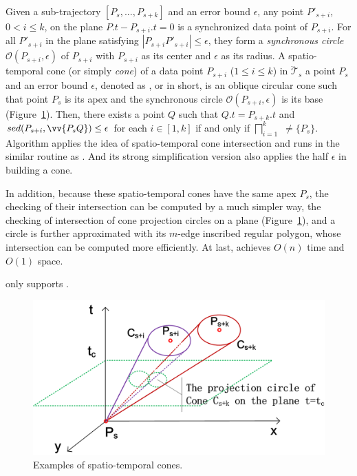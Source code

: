 Given a sub-trajectory $[P_s,...,P_{s+k}]$ and an error bound $\epsilon$, any point $P'_{s+i}$, $0< i \le k$, on the plane $P.t-P_{s+i}.t = 0$ is a synchronized data point of $P_{s+i}$. For all $P'_{s+i}$ in the plane satisfying $|P_{s+i}P'_{s+i}| \le \epsilon$, they form a \textit{synchronous circle $\mathcal{O}(P_{s+i}, \epsilon)$} of $P_{s+i}$ with $P_{s+i}$ as its center and $\epsilon$ as its radius.
%
A spatio-temporal cone (or simply \textit{cone}) of a data point $P_{s+i}$ ($1\le i\le k$) in $\dddot{\mathcal{T}}_s$ \wrt a point $P_s$ and an error bound $\epsilon$, denoted as , or  in short, is an oblique circular cone such that point $P_s$ is its apex and the synchronous circle $\mathcal{O}(P_{s+i}, \epsilon)$ is its base (Figure~\ref{fig:cis}).
%
Then, there exists a point $Q$ such that $Q.t = P_{s+k}.t$ and $sed(P_{s+i}, \vv{P_sQ})\le \epsilon$ for each $i \in [1,k]$ if and only if $\bigsqcap_{i=1}^{k}$ $\ne \{P_s\}$.
%
Algorithm \cised applies the idea of spatio-temporal cone intersection and runs in the similar routine as \siped. And its strong simplification version also applies the half $\epsilon$ in building a cone.

In addition, because these spatio-temporal cones have the same apex $P_s$, the checking of their intersection can be computed by a much simpler way, \ie the checking of intersection of cone projection circles on a plane (Figure~\ref{fig:cis}), and a circle is further approximated with its $m$-edge inscribed regular polygon, whose intersection can be computed more efficiently.
At last, \cised achieves $O(n)$ time and $O(1)$ space. 

\cised only supports \sed.

	
\begin{figure}[tb!]
	\centering
	\includegraphics[scale=0.66]{Figures/Fig-CIS.png}
	\vspace{-3ex}
	\caption{\small Examples of spatio-temporal cones.} %
	\vspace{-2ex}
	\label{fig:cis}
\end{figure}


